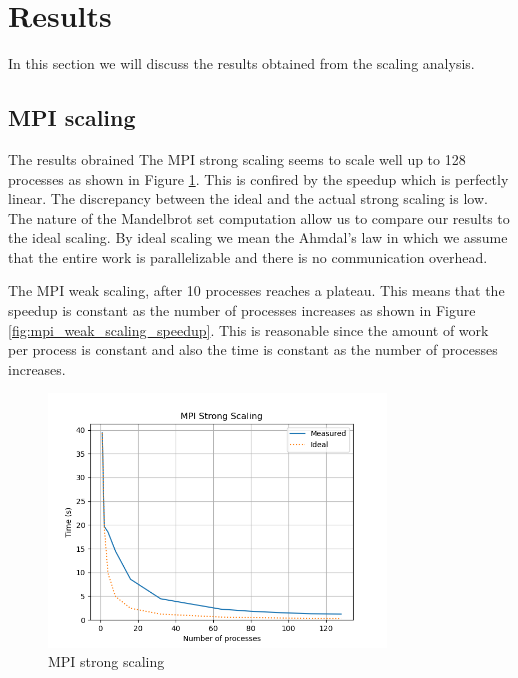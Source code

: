 \section{Results}

In this section we will discuss the results obtained from the scaling analysis.

\subsection{MPI scaling}

The results obrained The MPI strong scaling seems to scale well up to 128 processes as shown in Figure \ref{fig:mpi_strong_scaling}. This is confired by the speedup which is perfectly linear. The discrepancy between the ideal and the actual strong scaling is low. The nature of the Mandelbrot set computation allow us to compare our results to the ideal scaling. By ideal scaling we mean the Ahmdal's law in which we assume that the entire work is parallelizable and there is no communication overhead. 

The MPI weak scaling, after 10 processes reaches a plateau. This means that the speedup is constant as the number of processes increases as shown in Figure \ref{fig:mpi_weak_scaling_speedup}. This is reasonable since the amount of work per process is constant and also the time is constant as the number of processes increases.

\begin{figure}[h!]
    \centering
    \includegraphics[width=0.8\textwidth]{../images/mpi_strong_scaling.png}
    \caption{MPI strong scaling}
    \label{fig:mpi_strong_scaling}
\end{figure}


